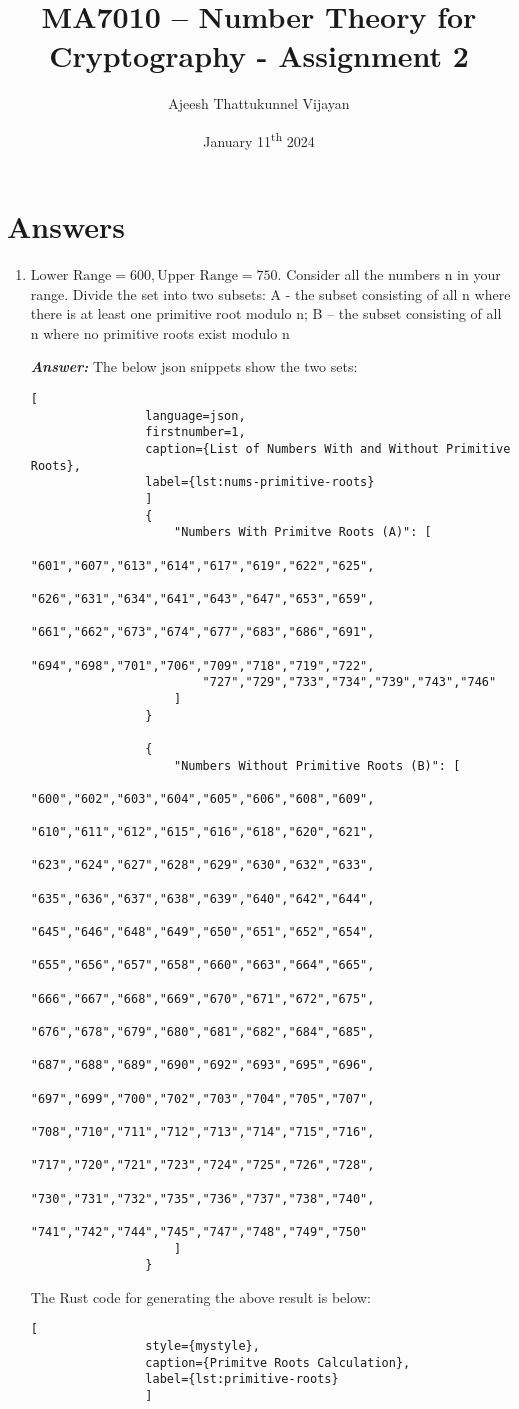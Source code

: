 \documentclass[11pt,a4paper,fleqn]{article}
\title{MA7010 – Number Theory for Cryptography - Assignment 2}
\author{Ajeesh Thattukunnel Vijayan}
\date{January 11\textsuperscript{th} 2024}
\begin{document}
	
	\maketitle
	\section{Answers} \label{sec:Forces}
	
	\begin{enumerate}[1.]
		\item $\text{Lower Range} = 600, \text{Upper Range} = 750$. Consider all the numbers n in your range. Divide the set into two subsets:
		A - the subset consisting of all n where there is at least one primitive root modulo n; B – the subset consisting of all n where no primitive roots exist modulo n
		\bigskip
		\begin{flushleft}
			\textbf{\textit{Answer:}} The below json snippets show the two sets:
			\begin{lstlisting}[
				language=json,
				firstnumber=1,
				caption={List of Numbers With and Without Primitive Roots},
				label={lst:nums-primitive-roots}
				]
				{
					"Numbers With Primitve Roots (A)": [ 
						"601","607","613","614","617","619","622","625",
						"626","631","634","641","643","647","653","659",
						"661","662","673","674","677","683","686","691",
						"694","698","701","706","709","718","719","722",
						"727","729","733","734","739","743","746"
					]
				}

				{
					"Numbers Without Primitive Roots (B)": [
						"600","602","603","604","605","606","608","609",
						"610","611","612","615","616","618","620","621",
						"623","624","627","628","629","630","632","633",
						"635","636","637","638","639","640","642","644",
						"645","646","648","649","650","651","652","654",
						"655","656","657","658","660","663","664","665",
						"666","667","668","669","670","671","672","675",
						"676","678","679","680","681","682","684","685",
						"687","688","689","690","692","693","695","696",
						"697","699","700","702","703","704","705","707",
						"708","710","711","712","713","714","715","716",
						"717","720","721","723","724","725","726","728",
						"730","731","732","735","736","737","738","740",
						"741","742","744","745","747","748","749","750"
					]
				}
			\end{lstlisting}
			
			The Rust code for generating the above result is below:
			\begin{lstlisting}[
				style={mystyle},
				caption={Primitve Roots Calculation},
				label={lst:primitive-roots}
				]
				

\end{lstlisting}
\end{flushleft}
\end{enumerate}
\end{document}
